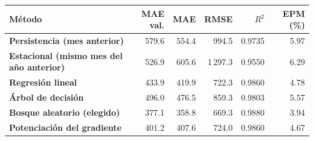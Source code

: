 \renewcommand{\arraystretch}{1.2}
\begin{tabular}{|>{\raggedright\arraybackslash}p{4.6cm}|r|r|r|r|r|}
\hline
\rowcolor{gray!20} \textbf{Método} & \textbf{MAE val.} & \textbf{MAE} & \textbf{RMSE} & \textbf{$R^2$} & \textbf{EPM (\%)} \\
\hline
\textbf{Persistencia (mes anterior)} & 579.6 & 554.4 & 994.5 & 0.9735 & 5.97 \\
\hline
\textbf{Estacional (mismo mes del año anterior)} & 526.9 & 605.6 & 1\,297.3 & 0.9550 & 6.29 \\
\hline
\textbf{Regresión lineal} & 433.9 & 419.9 & 722.3 & 0.9860 & 4.78 \\
\hline
\textbf{Árbol de decisión} & 496.0 & 476.5 & 859.3 & 0.9803 & 5.57 \\
\hline
\textbf{Bosque aleatorio (elegido)} & 377.1 & 358.8 & 669.3 & 0.9880 & 3.94 \\
\hline
\textbf{Potenciación del gradiente} & 401.2 & 407.6 & 724.0 & 0.9860 & 4.67 \\
\hline
\end{tabular}
